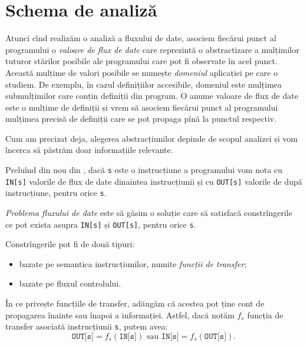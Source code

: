 
\section{Schema de analiză}
\label{sec:schema}

Atunci cînd realizăm o analiză a fluxului de date, asociem fiecărui
punct al programului o \emph{valoare de flux de date} care reprezintă
o abstractizare a mulțimilor tuturor stărilor posibile ale programului
care pot fi observate în acel punct. Această mulțime de valori posibile
se numește \emph{domeniul} aplicației pe care o studiem. De exemplu,
în cazul definițiilor accesibile, domeniul este mulțimea submulțimilor
care conțin definiții din program. O anume valoare de flux de date este
o mulțime de definiții și vrem să asociem fiecărui punct al programului
mulțimea precisă de definiții care se pot propaga pînă la punctul respectiv.

Cum am precizat deja, alegerea abstracțiunilor depinde de scopul analizei
și vom încerca să păstrăm doar informațiile relevante.

Preluînd din nou din \cite{aho}, dacă \texttt{s} este o instrucțiune a
programului vom nota cu \texttt{IN[s]} valorile de flux de date dinaintea
instrucțiunii și cu \texttt{OUT[s]} valorile de după instrucțiune,
pentru orice \texttt{s}.

\emph{Problema fluxului de date} este să găsim o soluție care să satisfacă
constrîngerile ce pot exista asupra \texttt{IN[s]} și \texttt{OUT[s]}, pentru
orice \texttt{s}.

Constrîngerile pot fi de două tipuri:
\begin{itemize}
\item bazate pe semantica instrucțiunilor, numite \emph{funcții de transfer};
\item bazate pe fluxul controlului.
\end{itemize}

În ce privește funcțiile de transfer, adăugăm că acestea pot ține cont
de propagarea î\-na\-in\-te sau înapoi a informației. Astfel, dacă notăm $ f_s $
funcția de transfer asociată instrucțiunii \texttt{s}, putem avea:
\[
  \texttt{OUT[s]} = f_s(\texttt{IN[s]}) \text{ sau } %
  \texttt{IN[s]} = f_s(\texttt{OUT[s]}).
\]


